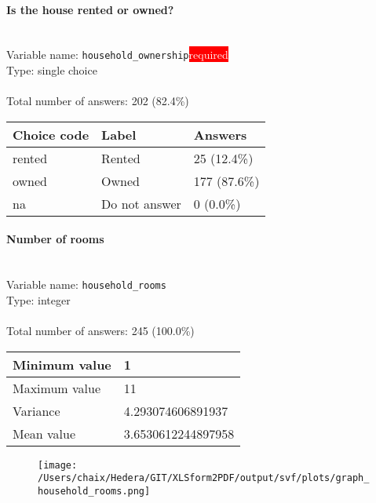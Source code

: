 \documentclass[11.5pt, a4paper]{scrartcl}
\begin{document}
\paragraph{Is the house rented or owned?}
\  \\Variable name: \texttt{household\_ownership}\hfill\colorbox{red}{\small{\textcolor{white}{required}}}\\
 Type: single choice\\
\\Total number of answers: 202 (82.4\%)
\\[0.2em] \begin{tabular}{p{4cm}|p{8cm}|p{3cm}}
Choice code & Label & Answers \\
\hline
rented & Rented& \cellcolor{color0}25 (12.4\%)\\
\cellcolor{mygray} owned & \cellcolor{mygray}Owned & \cellcolor{color4}177 (87.6\%)\\
na & Do not answer& \cellcolor{color0}0 (0.0\%)\\
\end{tabular}
\paragraph{Number of rooms}
\  \\Variable name: \texttt{household\_rooms}\\
Type: integer\\
\\Total number of answers: 245 (100.0\%)
\\[0.2em] \begin{tabular}{p{4cm}|p{8cm}}
Minimum value &1 \\
\hline
\cellcolor{mygray} Maximum value & \cellcolor{mygray}11 \\
\hline
Variance &4.293074606891937 \\
\hline
\cellcolor{mygray} Mean value & \cellcolor{mygray}3.6530612244897958 \\
\hline
\end{tabular}
\begin{figure}[H]
\centering
\texttt{[image: /Users/chaix/Hedera/GIT/XLSform2PDF/output/svf/plots/graph\_household\_rooms.png]}
\end{figure}
\end{document}
